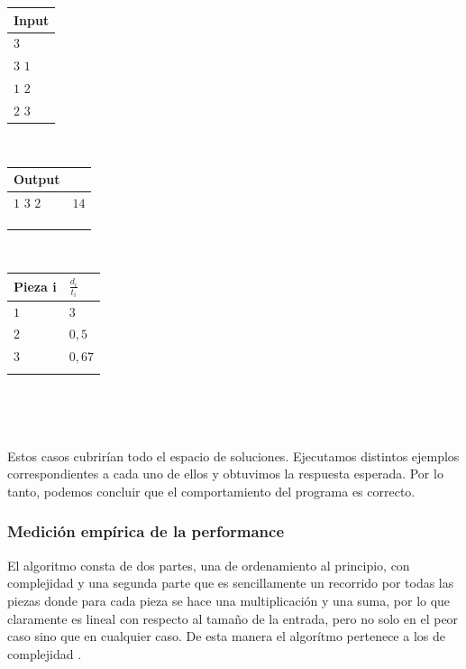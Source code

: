 \documentclass[11pt, a4paper, twoside]{article}
\begin{document}
\begin{enumerate}
\begin{itemize}
		\begin{minipage}{0.2\textwidth}
			\begin{tabular}{l}
				Input  \\
				\hline
				$3$   \\
				$3$ $1$ \\
				$1$ $2$ \\
				$2$ $3$ \\
			\end{tabular} \\ 
		\end{minipage}
		\begin{minipage}{0.3\textwidth}
			\begin{tabular}{ll}
				Output  \\
				\hline
				$1$ $3$ $2$ & $14$ \\
				\\
				\\
				\\
			\end{tabular} \\ 
		\end{minipage}  
        	\begin{minipage}{0.2\textwidth}
			\begin{tabular}{l|l}
				Pieza i & $\frac{d_i}{t_i}$  \\
				\hline
				$1$     & $3$ \\
				$2$     & $0,5$ \\
				$3$     & $0,67$ \\
				\\
			\end{tabular} \\ 
		\end{minipage}  \\		
		
	\end{itemize}
	
\end{enumerate}

Estos casos cubrirían todo el espacio de soluciones. Ejecutamos distintos ejemplos correspondientes a cada
uno de ellos y obtuvimos la respuesta esperada. Por lo tanto, podemos concluir que el comportamiento del programa 
es correcto. 

\newpage
\subsubsection{Medición empírica de la performance}

El algoritmo consta de dos partes, una de ordenamiento al principio, con complejidad 
y una segunda parte que es sencillamente un recorrido por todas las piezas donde para cada pieza se hace
una multiplicación y una suma, por lo que claramente es lineal con respecto al tamaño de la entrada, pero no solo
en el peor caso sino que en cualquier caso. De esta manera el algorítmo pertenece a los de complejidad .
\end{document}
